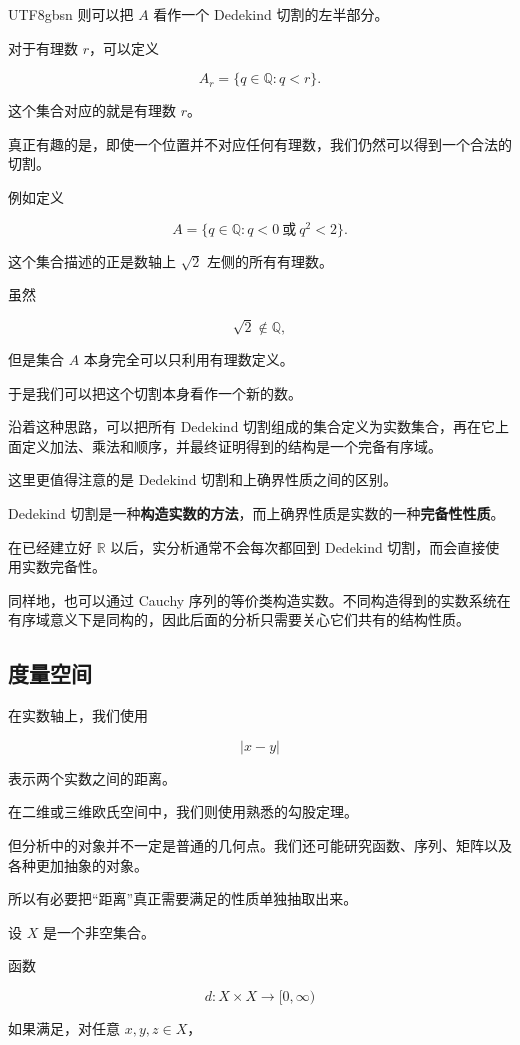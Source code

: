 \documentclass[11pt]{article}
\begin{document}
\begin{CJK*}{UTF8}{gbsn}
则可以把 $A$ 看作一个 Dedekind 切割的左半部分。

对于有理数 $r$，可以定义

\[
A_{r}=\{q\in\mathbb{Q}:q<r\}.
\]

这个集合对应的就是有理数 $r$。

真正有趣的是，即使一个位置并不对应任何有理数，我们仍然可以得到一个合法的切割。

例如定义

\[
A=\{q\in\mathbb{Q}:q<0\ \text{或}\ q^{2}<2\}.
\]

这个集合描述的正是数轴上 $\sqrt{2}$ 左侧的所有有理数。

虽然

\[
\sqrt{2}\notin\mathbb{Q},
\]

但是集合 $A$ 本身完全可以只利用有理数定义。

于是我们可以把这个切割本身看作一个新的数。

沿着这种思路，可以把所有 Dedekind 切割组成的集合定义为实数集合，再在它上面定义加法、乘法和顺序，并最终证明得到的结构是一个完备有序域。

这里更值得注意的是 Dedekind 切割和上确界性质之间的区别。

Dedekind 切割是一种\textbf{构造实数的方法}，而上确界性质是实数的一种\textbf{完备性性质}。

在已经建立好 $\mathbb{R}$ 以后，实分析通常不会每次都回到 Dedekind 切割，而会直接使用实数完备性。

同样地，也可以通过 Cauchy 序列的等价类构造实数。不同构造得到的实数系统在有序域意义下是同构的，因此后面的分析只需要关心它们共有的结构性质。

\subsection{度量空间}

在实数轴上，我们使用

\[
|x-y|
\]

表示两个实数之间的距离。

在二维或三维欧氏空间中，我们则使用熟悉的勾股定理。

但分析中的对象并不一定是普通的几何点。我们还可能研究函数、序列、矩阵以及各种更加抽象的对象。

所以有必要把“距离”真正需要满足的性质单独抽取出来。

设 $X$ 是一个非空集合。

函数

\[
d:X\times X\rightarrow[0,\infty)
\]

如果满足，对任意 $x,y,z\in X$，


\end{CJK*}
\end{document}
